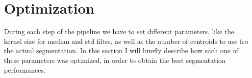 \documentclass{standalone}
\begin{document}
	\section{Optimization}
	
	During each step of the pipeline we have to set different parameters, like the kernel size for median and std filter, as well as the number of centroids to use fro the actual segmentation. In this section I will birefly describe how each one of these parameters was optimized, in order to obtain the best segmentation performances.
\end{document}
